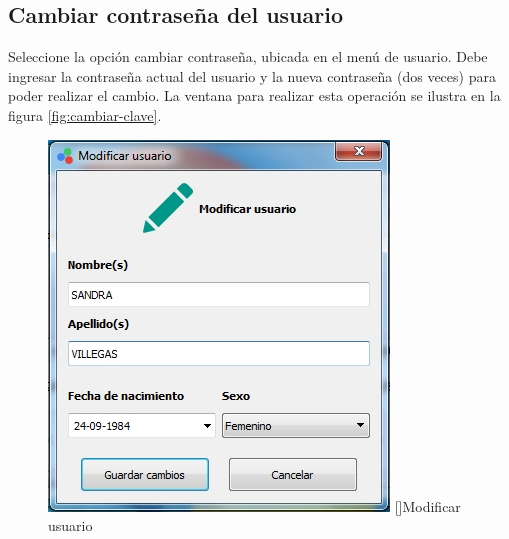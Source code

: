 	\subsection*{Cambiar contrase\~{n}a del usuario}

	Seleccione la opci\'{o}n cambiar contrase\~{n}a, ubicada en el men\'{u} de usuario. Debe ingresar la contrase\~{n}a actual del usuario y la nueva contrase\~{n}a (dos veces) para poder realizar el cambio. La ventana para realizar esta operaci\'{o}n se ilustra en la figura \ref{fig:cambiar-clave}.

\begin{figure}[H]
\centering
\begin{minipage}{.5\textwidth}
  \centering
  \includegraphics[width=.9\linewidth]{./img/modificar-usuario.jpg}
  []{Modificar usuario\label{fig:modificar-usuario}}
  \label{fig:test1}
\end{minipage}%
\begin{minipage}{.5\textwidth}
  \centering

\end{minipage}
\end{figure}
